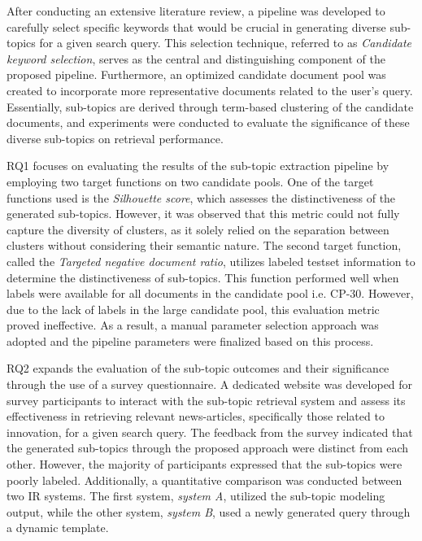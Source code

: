 After conducting an extensive literature review, a pipeline was developed to carefully select specific keywords that would be crucial in generating diverse sub-topics for a given search query. This selection technique, referred to as \emph{Candidate keyword selection}, serves as the central and distinguishing component of the proposed pipeline. Furthermore, an optimized candidate document pool was created to incorporate more representative documents related to the user's query. Essentially, sub-topics are derived through term-based clustering of the candidate documents, and experiments were conducted to evaluate the significance of these diverse sub-topics on retrieval performance.


RQ1 focuses on evaluating the results of the sub-topic extraction pipeline by employing two target functions on two candidate pools. One of the target functions used is the \emph{Silhouette score}, which assesses the distinctiveness of the generated sub-topics. However, it was observed that this metric could not fully capture the diversity of clusters, as it solely relied on the separation between clusters without considering their semantic nature. The second target function, called the \emph{Targeted negative document ratio}, utilizes labeled testset information to determine the distinctiveness of sub-topics. This function performed well when labels were available for all documents in the candidate pool i.e. CP-30. However, due to the lack of labels in the large candidate pool, this evaluation metric proved ineffective. As a result, a manual parameter selection approach was adopted and the pipeline parameters were finalized based on this process. 

RQ2 expands the evaluation of the sub-topic outcomes and their significance through the use of a survey questionnaire. A dedicated website was developed for survey participants to interact with the sub-topic retrieval system and assess its effectiveness in retrieving relevant news-articles, specifically those related to innovation, for a given search query. The feedback from the survey indicated that the generated sub-topics through the proposed approach were distinct from each other. However, the majority of participants expressed that the sub-topics were poorly labeled. Additionally, a quantitative comparison was conducted between two \ac{IR} systems. The first system, \emph{system A}, utilized the sub-topic modeling output, while the other system, \emph{system B}, used a newly generated query through a dynamic template.

